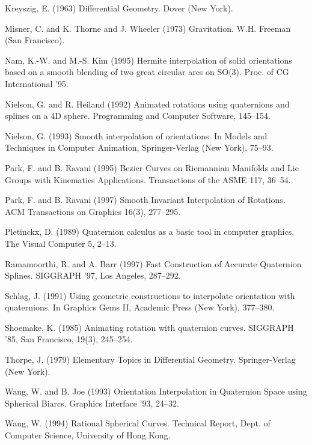 \begin{thebibliography}{Lozano-Perez 83}
Kreyszig, E. (1963)
Differential Geometry.
Dover (New York).

Misner, C. and K. Thorne and J. Wheeler (1973)
Gravitation.
W.H. Freeman (San Francisco).

Nam, K.-W. and M.-S. Kim (1995)
Hermite interpolation of solid orientations based on a smooth blending
of two great circular arcs on SO(3).
Proc. of CG International '95.

Nielson, G. and R. Heiland (1992)
Animated rotations using quaternions and splines on a 4D sphere.
Programming and Computer Software, 145--154.

Nielson, G. (1993)
Smooth interpolation of orientations.
In Models and Techniques in Computer Animation, Springer-Verlag (New York),
75--93.

Park, F. and B. Ravani (1995)
Bezier Curves on Riemannian Manifolds and Lie Groups with
Kinematics Applications.
Transactions of the ASME 117, 36--54.

Park, F. and B. Ravani (1997)
Smooth Invariant Interpolation of Rotations.
ACM Transactions on Graphics 16(3), 277--295.

Pletinckx, D. (1989) 
Quaternion calculus as a basic tool in computer graphics.
The Visual Computer 5, 2--13.

Ramamoorthi, R. and A. Barr (1997)
Fast Construction of Accurate Quaternion Splines.
SIGGRAPH '97, Los Angeles, 287--292.

Schlag, J. (1991) Using geometric constructions to interpolate
orientation with quaternions.  In Graphics Gems II, Academic Press (New York),
377--380.

Shoemake, K. (1985) Animating rotation with quaternion curves.
SIGGRAPH '85, San Francisco, 19(3), 245--254.

Thorpe, J. (1979)
Elementary Topics in Differential Geometry.
Springer-Verlag (New York).

Wang, W. and B. Joe (1993)
Orientation Interpolation in Quaternion Space using Spherical Biarcs.
Graphics Interface '93, 24--32.

Wang, W. (1994)
Rational Spherical Curves.
Technical Report, Dept. of Computer Science, University of Hong Kong.


\end{thebibliography}

